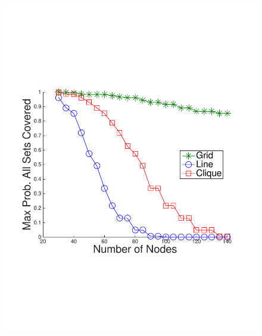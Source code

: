\begin{figure}
{	\includegraphics[scale=0.22, clip=true, trim=14mm 65mm 22mm 65mm]{figures/use_cases_examples/cluster/cluster_cov_perc_vs_num_nodes_50_T_12_IS_2_W_color.pdf}
        \label{fig:use_case_sum_sim_vs_num_nodes}
        }
  \subfigure[Max N vs. Prob. All Sets Covered (Timeliness = 10)]{
}
\end{figure}
